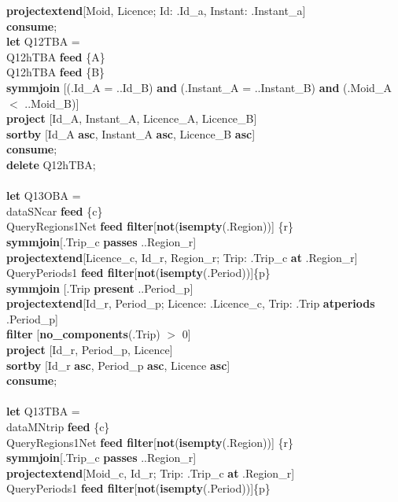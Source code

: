 \documentclass[a4paper]{article}
\newcommand{\op}[1]{\textbf{#1}}
\begin{document}
\begin{scriptsize}
\begin{tabbing}
\>\op{projectextend}[Moid, Licence; Id: .Id\_a, Instant: .Instant\_a]\\
\op{consume};\\
\op{let} Q12TBA =\\
\>Q12hTBA \op{feed} \{A\}\\
\>Q12hTBA \op{feed} \{B\}\\
\>\op{symmjoin} [(.Id\_A = ..Id\_B) \op{and} (.Instant\_A = ..Instant\_B) \op
{and} (.Moid\_A $<$ ..Moid\_B)]\\
\>\op{project} [Id\_A, Instant\_A, Licence\_A, Licence\_B]\\
\>\op{sortby} [Id\_A \op{asc}, Instant\_A \op{asc}, Licence\_B \op{asc}]\\
\op{consume};\\
\op{delete} Q12hTBA;\\
\\
\op{let} Q13OBA =\\
\>dataSNcar \op{feed} \{c\}\\
\>QueryRegions1Net \op{feed filter}[\op{not}(\op{isempty}(.Region))] \{r\}\\
\>\op{symmjoin}[.Trip\_c \op{passes} ..Region\_r]\\
\>\op{projectextend}[Licence\_c, Id\_r, Region\_r; Trip: .Trip\_c \op{at}
.Region\_r]\\
\>QueryPeriods1 \op{feed filter}[\op{not}(\op{isempty}(.Period))]\{p\}\\
\>\op{symmjoin} [.Trip \op{present} ..Period\_p]\\
\>\op{projectextend}[Id\_r, Period\_p; Licence: .Licence\_c, Trip: .Trip
\op{atperiods} .Period\_p]\\
\>\op{filter} [\op{no\_components}(.Trip) $>$ 0]\\
\>\op{project} [Id\_r, Period\_p, Licence]\\
\>\op{sortby} [Id\_r \op{asc}, Period\_p \op{asc}, Licence \op{asc}]\\
\op{consume};\\
\\
\op{let} Q13TBA =\\
\>dataMNtrip \op{feed} \{c\}\\
\>QueryRegions1Net \op{feed filter}[\op{not}(\op{isempty}(.Region))] \{r\}\\
\>\op{symmjoin}[.Trip\_c \op{passes} ..Region\_r]\\
\>\op{projectextend}[Moid\_c, Id\_r; Trip: .Trip\_c \op{at} .Region\_r]\\
\>QueryPeriods1 \op{feed filter}[\op{not}(\op{isempty}(.Period))]\{p\}\\

\end{tabbing}
\end{scriptsize}
\end{document}
